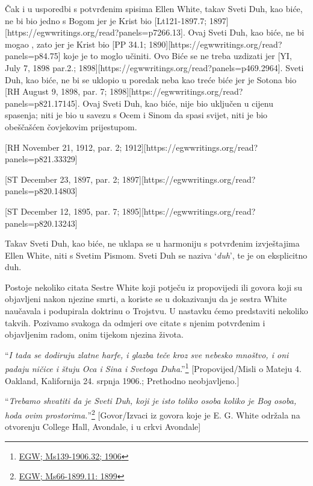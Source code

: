 Čak i u usporedbi s potvrđenim spisima Ellen White, takav Sveti Duh, kao biće, ne bi bio jedno s Bogom jer je Krist bio [Lt121-1897.7; 1897][https://egwwritings.org/read?panels=p7266.13]. Ovaj Sveti Duh, kao biće, ne bi mogao , zato jer je Krist bio [PP 34.1; 1890][https://egwwritings.org/read?panels=p84.75] koje je to moglo učiniti. Ovo Biće se ne treba uzdizati jer [YI, July 7, 1898 par.2.; 1898][https://egwwritings.org/read?panels=p469.2964]. Sveti Duh, kao biće, ne bi se uklopio u poredak neba kao treće biće jer je Sotona bio [RH August 9, 1898, par. 7; 1898][https://egwwritings.org/read?panels=p821.17145]. Ovaj Sveti Duh, kao biće, nije bio uključen u cijenu spasenja; niti je bio u savezu s Ocem i Sinom da spasi svijet, niti je bio obeščašćen čovjekovim prijestupom.

[RH November 21, 1912, par. 2; 1912][https://egwwritings.org/read?panels=p821.33329]

[ST December 23, 1897, par. 2; 1897][https://egwwritings.org/read?panels=p820.14803]

[ST December 12, 1895, par. 7; 1895][https://egwwritings.org/read?panels=p820.13243]

Takav Sveti Duh, kao biće, ne uklapa se u harmoniju s potvrđenim izvještajima Ellen White, niti s Svetim Pismom. Sveti Duh se naziva ‘\textit{duh}’, te je on eksplicitno duh.

Postoje nekoliko citata Sestre White koji potječu iz propovijedi ili govora koji su objavljeni nakon njezine smrti, a koriste se u dokazivanju da je sestra White naučavala i podupirala doktrinu o Trojstvu. U nastavku ćemo predstaviti nekoliko takvih. Pozivamo svakoga da odmjeri ove citate s njenim potvrđenim i objavljenim radom, onim tijekom njezina života.

“\textit{I tada se dodiruju zlatne harfe, i glazba teče kroz sve nebesko mnoštvo, i oni padaju ničice i štuju Oca i Sina i Svetoga Duha}.”\footnote{\href{https://egwwritings.org/?ref=en_Ms139-1906.32&para=9579.38}{EGW; Ms139-1906.32; 1906}} [Propovijed/Misli o Mateju 4. Oakland, Kalifornija 24. srpnja 1906.; Prethodno neobjavljeno.]

“\textit{Trebamo shvatiti da je Sveti Duh, koji je isto toliko osoba koliko je Bog osoba, hoda ovim prostorima.}”\footnote{\href{https://egwwritings.org/?ref=en_Ms66-1899.11&para=6622.19}{EGW; Ms66-1899.11: 1899}} [Govor/Izvaci iz govora koje je E. G. White održala na otvorenju College Hall, Avondale, i u crkvi Avondale]
